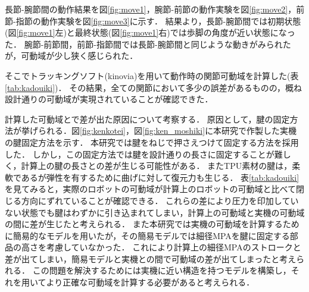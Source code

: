 \documentclass{jarticle}
\begin{document}
長節-腕節間の動作結果を図\ref{fig:move1}，腕節-前節の動作実験を図\ref{fig:move2}，前節-指節の動作実験を図\ref{fig:move3}に示す．
結果より，長節-腕節間では初期状態(図\ref{fig:move1}左)と最終状態(図\ref{fig:move1}右)では歩脚の角度が近い状態になった．
腕節-前節間，前節-指節間では長節-腕節間と同じような動きがみられたが，可動域が少し狭く感じられた．

そこでトラッキングソフト(kinovia)を用いて動作時の関節可動域を計算した(表\ref{tab:kadouiki})．
その結果，全ての関節において多少の誤差があるものの，概ね設計通りの可動域が実現されていることが確認できた．

計算した可動域とで差が出た原因について考察する．
原因として，腱の固定方法が挙げられる．図\ref{fig:kenkotei}，図\ref{fig:ken_moshiki}に本研究で作製した実機の腱固定方法を示す．
本研究では腱をねじで押さえつけて固定する方法を採用した．
しかし，この固定方法では腱を設計通りの長さに固定することが難しく，計算上の腱の長さとの差が生じる可能性がある．
またTPU素材の腱は，柔軟であるが弾性を有するために曲げに対して復元力も生じる．
表\ref{tab:kadouiki}を見てみると，実際のロボットの可動域が計算上のロボットの可動域と比べて閉じる方向にずれていることが確認できる．
これらの差により圧力を印加していない状態でも腱はわずかに引き込まれてしまい，計算上の可動域と実機の可動域の間に差が生じたと考えられる．
また本研究では実機の可動域を計算するために簡易的なモデルを用いたが，その簡易モデルでは細径MPAを腱に固定する部品の高さを考慮していなかった．
これにより計算上の細径MPAのストロークと差が出てしまい，簡易モデルと実機との間で可動域の差が出てしまったと考えられる．
この問題を解決するためには実機に近い構造を持つモデルを構築し，それを用いてより正確な可動域を計算する必要があると考えられる．

\end{document}
